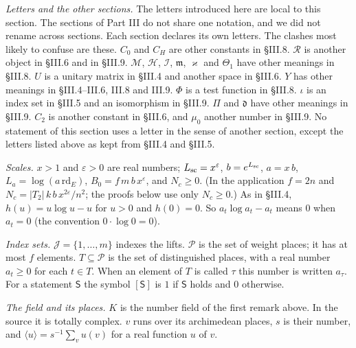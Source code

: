 \documentclass[11pt,letterpaper]{article}
\begin{document}
\emph{Letters and the other sections.} The letters introduced here are local to this section. The
sections of Part III do not share one notation, and we did not rename across sections. Each section
declares its own letters. The clashes most likely to confuse are these. $C_0$ and $C_H$ are other
constants in \S III.8. $\mathcal R$ is another object in \S III.6 and in \S III.9. $\mathcal M$,
$\mathcal H$, $\mathcal I$, $\mathfrak m$, $\varkappa$ and $\Theta_1$ have other meanings in \S III.8.
$U$ is a unitary matrix in \S III.4 and another space in \S III.6. $Y$ has other meanings in
\S III.4--III.6, III.8 and III.9. $\Phi$ is a test function in \S III.8. $\iota$ is an index set in
\S III.5 and an isomorphism in \S III.9. $\Pi$ and $\mathfrak d$ have other meanings in \S III.9. $C_2$
is another constant in \S III.6, and $\mu_0$ another number in \S III.9. No statement of this section
uses a letter in the sense of another section, except the letters listed above as kept from \S III.4 and
\S III.5.

\emph{Scales.} $x>1$ and $\varepsilon>0$ are real numbers; $L_{\rm sc}=x^{\varepsilon}$,
$b=e^{L_{\rm sc}}$, $a=x\,b$, $L_a=\log(a\,\mathrm{rd}_E)$, $B_0=f\,m\,b\,x^{\varepsilon}$, and $N_c\ge0$.
(In the application $f=2n$ and $N_c=|T_2|\,k\,b\,x^{2\varepsilon}/n^2$; the proofs below use only
$N_c\ge0$.) As in \S III.4, $h(u)=u\log u-u$ for $u>0$ and $h(0)=0$. So
$a_t\log a_t-a_t$ means $0$ when $a_t=0$ (the convention $0\cdot\log0=0$).

\emph{Index sets.} $\mathcal J=\{1,\dots,m\}$ indexes the lifts. $\mathcal P$ is the set of weight
places; it has at most $f$ elements. $T\subseteq\mathcal P$ is the set of distinguished places, with a
real number $a_t\ge0$ for each $t\in T$. When an element of $T$ is called $\tau$ this number is written
$a_\tau$. For a statement $\mathsf S$ the symbol $[\mathsf S]$ is $1$ if $\mathsf S$ holds and $0$
otherwise.

\emph{The field and its places.} $K$ is the number field of the first remark above. In the source it is
totally complex. $v$ runs over its archimedean places, $s$ is their number, and
$\langle u\rangle=s^{-1}\sum_vu(v)$ for a real function $u$ of $v$.
\end{document}
